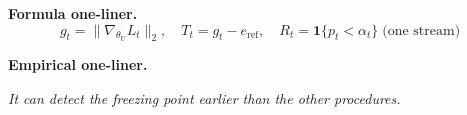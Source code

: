 \documentclass[11pt]{article}
\newcommand{\gradU}{\nabla_{\theta_U}}
\begin{document}
\vspace{1em}
\noindent\textbf{Formula one-liner.}
\[
\boxed{\;
  g_t=\bigl\|\gradU L_t\bigr\|_2,\quad
  T_t=g_t-e_{\mathrm{ref}},\quad
  R_t=\mathbf{1}\{p_t<\alpha_t\}
  \;\text{(one stream)}
\;}
\]

\vspace{0.75em}
\noindent\textbf{Empirical one-liner.}
\begin{center}
\emph{It can detect the freezing point earlier than the other procedures.}
\end{center}
\end{document}
